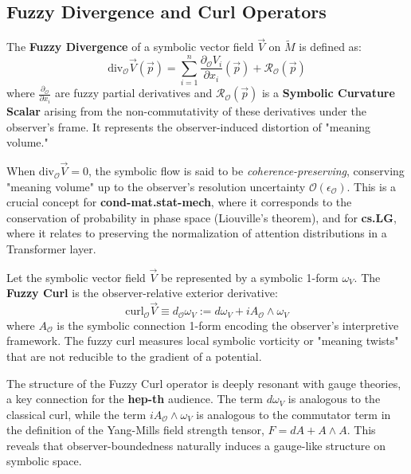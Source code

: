 \subsection{Fuzzy Divergence and Curl Operators}
\label{subsec:bk4_fuzzy_div_curl}

\begin{definition}
\label{definition:bk4_fuzzy_divergence_operator}
The \textbf{Fuzzy Divergence} of a symbolic vector field $\vec{V}$ on $\tilde{M}$ is defined as:
\[
\text{div}_{\mathcal{O}} \vec{V}(\vec{p}) = \sum_{i=1}^n \frac{\partial_{\mathcal{O}} V_i}{\partial x_i}(\vec{p}) + \mathcal{R}_{\mathcal{O}}(\vec{p})
\]
where $\frac{\partial_{\mathcal{O}}}{\partial x_i}$ are fuzzy partial derivatives and $\mathcal{R}_{\mathcal{O}}(\vec{p})$ is a \textbf{Symbolic Curvature Scalar} arising from the non-commutativity of these derivatives under the observer's frame. It represents the observer-induced distortion of "meaning volume."
\end{definition}

\begin{scholium}
\label{scholium:bk4_meaning_volume}
When $\text{div}_{\mathcal{O}} \vec{V} = 0$, the symbolic flow is said to be \emph{coherence-preserving}, conserving "meaning volume" up to the observer's resolution uncertainty $\mathcal{O}(\epsilon_{\mathcal{O}})$. This is a crucial concept for \textbf{cond-mat.stat-mech}, where it corresponds to the conservation of probability in phase space (Liouville's theorem), and for \textbf{cs.LG}, where it relates to preserving the normalization of attention distributions in a Transformer layer.
\end{scholium}

\begin{definition}
\label{definition:bk4_fuzzy_curl_operator}
Let the symbolic vector field $\vec{V}$ be represented by a symbolic 1-form $\omega_V$. The \textbf{Fuzzy Curl} is the observer-relative exterior derivative:
\[
\text{curl}_{\mathcal{O}} \vec{V} \equiv d_{\mathcal{O}} \omega_V := d\omega_V + i A_{\mathcal{O}} \wedge \omega_V
\]
where $A_{\mathcal{O}}$ is the symbolic connection 1-form encoding the observer's interpretive framework. The fuzzy curl measures local symbolic vorticity or "meaning twists" that are not reducible to the gradient of a potential.
\end{definition}

\begin{scholium}
\label{scholium:bk4_gauge_relation}
The structure of the Fuzzy Curl operator is deeply resonant with gauge theories, a key connection for the \textbf{hep-th} audience. The term $d\omega_V$ is analogous to the classical curl, while the term $i A_{\mathcal{O}} \wedge \omega_V$ is analogous to the commutator term in the definition of the Yang-Mills field strength tensor, $F = dA + A \wedge A$. This reveals that observer-boundedness naturally induces a gauge-like structure on symbolic space.
\end{scholium}

